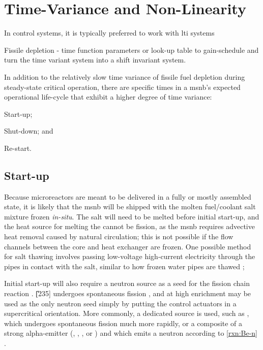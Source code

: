 \section{Time-Variance and Non-Linearity}
In control systems, it is typically preferred to work with \acf{lti} systems

Fissile depletion - time function parameters or look-up table to gain-schedule and turn the time variant system into a shift invariant system.

In addition to the relatively slow time variance of fissile fuel depletion during steady-state critical operation, there are specific times in a \acs{msnb}'s expected operational life-cycle that exhibit a higher degree of time variance: 
\begin{enumerate*}
\item Start-up; \item Shut-down; and \item Re-start.
\end{enumerate*}

\subsection{Start-up}
Because microreactors are meant to be delivered in a fully or mostly assembled state, it is likely that the \acs{msnb} will be shipped with the molten fuel/coolant salt mixture frozen \textit{in-situ}. The salt will need to be melted before initial start-up, and the heat source for melting the cannot be fission, as the \acs{msnb} requires advective heat removal caused by natural circulation; this is not possible if the flow channels between the core and heat exchanger are frozen. One possible method for salt thawing involves passing low-voltage high-current electricity through the pipes in contact with the salt, similar to how frozen water pipes are thawed \cite{Thawing};

Initial start-up will also require a neutron source as a seed for the fission chain reaction \cite[Ch. 2]{DH}. \U[235] undergoes spontaneous fission \cite[Ch. 6]{Faw}, and at high enrichment may be used as the only neutron seed simply by putting the control actuators in a supercritical orientation. More commonly, a dedicated source is used, such as \Ca[252], which undergoes spontaneous fission much more rapidly, or a composite of a strong alpha-emitter (\eg \Pu[238], \Am[241], \Po[210], or \Ra[226]) and \Be[9] which emits a neutron according to \ref{rxn:Be-n} \cite[Ch. 2]{Handbook}.


